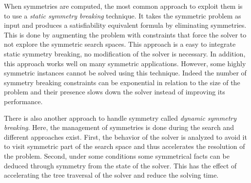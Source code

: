 When symmetries are computed, the most common approach to exploit them is to use a \emph{static symmetry breaking} technique.
It takes the symmetric problem as input and produces a satisfiability equivalent formula by eliminating symmetries. This is done by augmenting the problem with constraints that force the solver to not explore the symmetric search  spaces.
This approach is a easy to integrate static symmetry breaking, no modification of the solver is necessary.
In addition, this approach works well on many symmetric applications.
However, some highly symmetric instances cannot be solved using this technique. 
Indeed the number of symmetry breaking constraints can be exponential in relation to the size of the problem
 and their presence slows down the solver instead of improving its performance.

There is also another approach to handle symmetry called \emph{dynamic symmetry breaking}. Here, the management of
symmetries is done during the search and different approaches exist. First, the behavior of the solver is analyzed to avoid 
it to visit symmetric part of the search space and thus accelerates the resolution of the problem.
Second, under some conditions some symmetrical facts can be deduced through symmetry from the
state of the solver. This has the effect of accelerating the tree traversal of the solver and reduce the solving time.

%
%
%
%
%
%


